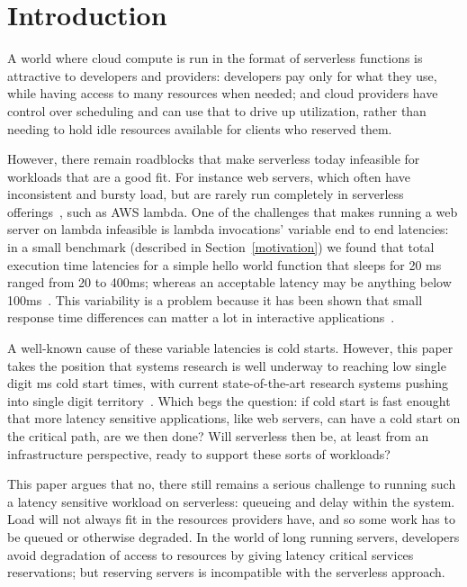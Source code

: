 \section{Introduction}

A world where cloud compute is run in the format of serverless functions is
attractive to developers and providers: developers pay only for what they use,
while having access to many resources when needed; and cloud providers have
control over scheduling and can use that to drive up utilization, rather than
needing to hold idle resources available for clients who reserved them.


However, there remain roadblocks that make serverless today infeasible for
workloads that are a good fit. For instance web servers, which often have
inconsistent and bursty load, but are rarely run completely in serverless
offerings~\cite{reddit-serverless1}, such as AWS lambda. One of the challenges
that makes running a web server on lambda infeasible is lambda invocations'
variable end to end latencies: in a small benchmark (described in
Section~\ref{motivation}) we found that total execution time latencies for a
simple hello world function that sleeps for 20 ms ranged from 20 to 400ms;
whereas an acceptable latency may be anything below 100ms~\cite{page-load-time}.
This variability is a problem because it has been shown that small response time
differences can matter a lot in interactive
applications~\cite{amz-page-load,google-page-load}.


A well-known cause of these variable latencies is cold starts. However, this
paper takes the position that systems research is well underway to reaching low
single digit ms cold start times, with current state-of-the-art research systems
pushing into single digit territory~\cite{sigmaos,mitosis}. Which begs the
question: if cold start is fast enought that more latency sensitive
applications, like web servers, can have a cold start on the critical path, are
we then done? Will serverless then be, at least from an infrastructure
perspective, ready to support these sorts of workloads?

This paper argues that no, there still remains a serious challenge to running
such a latency sensitive workload on serverless: queueing and delay within the
system. Load will not always fit in the resources providers have, and so some
work has to be queued or otherwise degraded. In the world of long running
servers, developers avoid degradation of access to resources by giving latency
critical services reservations; but reserving servers is incompatible with the
serverless approach. 



